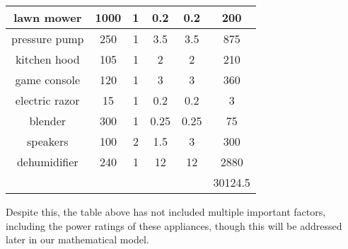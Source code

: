 \begin{table}[H]
\begin{tabular}{|c|c|c|c|c|c|}
    \midrule
    lawn mower & 1000  & 1     & 0.2   & 0.2   & 200 \\
    \midrule
    pressure pump & 250   & 1     & 3.5   & 3.5   & 875 \\
    \midrule
    kitchen hood & 105   & 1     & 2     & 2     & 210 \\
    \midrule
    game console & 120   & 1     & 3     & 3     & 360 \\
    \midrule
    electric razor & 15    & 1     & 0.2   & 0.2   & 3 \\
    \midrule
    blender & 300   & 1     & 0.25  & 0.25  & 75 \\
    \midrule
    speakers & 100   & 2     & 1.5   & 3     & 300 \\
    \midrule
    dehumidifier & 240   & 1     & 12    & 12    & 2880 \\
    \midrule
          &       &       &       &       & 30124.5 \\
    \bottomrule
    \end{tabular}%
  \label{tab:tabl1}%
\end{table}%
\newpage
Despite this, the table above has not included multiple important factors, including the power ratings of these appliances, though this will be addressed later in our mathematical model.